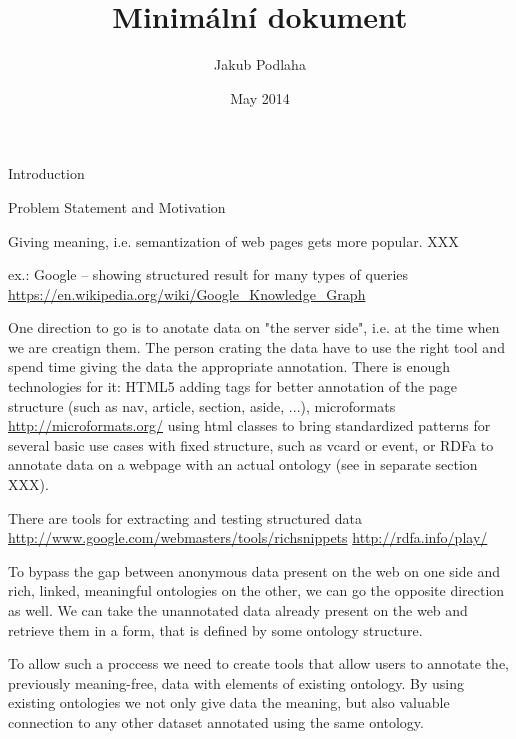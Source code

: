 
\worktype [M/CZ]
\title {Minimální dokument}
\author {Jakub Podlaha}
\date {May 2014}
\makefront



\chap Introduction

\sec Problem Statement and Motivation

Giving meaning, i.e. semantization of web pages gets more popular. XXX

ex.: Google -- showing structured result for many types of queries
\url{https://en.wikipedia.org/wiki/Google_Knowledge_Graph}


One direction to go is to anotate data on "the server side", i.e. at the time
when we are creatign them. The person crating the data have to use the right
tool and spend time giving the data the appropriate annotation. There is enough
technologies for it: HTML5 adding tags for better annotation of the page
structure (such as nav, article, section, aside, ...), microformats
\url{http://microformats.org/} using html classes to bring standardized
patterns for several basic use cases with fixed structure, such as vcard or
event, or RDFa to annotate data on a webpage with an actual ontology (see in
separate section XXX).

There are tools for extracting and testing structured data 
\url{http://www.google.com/webmasters/tools/richsnippets}
\url{http://rdfa.info/play/}

To bypass the gap between anonymous data present on the web on one side and
rich, linked, meaningful ontologies on the other, we can go the opposite
direction as well. We can take the unannotated data already present on the web
and retrieve them in a form, that is defined by some ontology structure. 

To allow such a proccess we need to create tools that allow users to annotate
the, previously meaning-free, data with elements of existing ontology. By using
existing ontologies we not only give data the meaning, but also valuable
connection to any other dataset annotated using the same ontology. 




